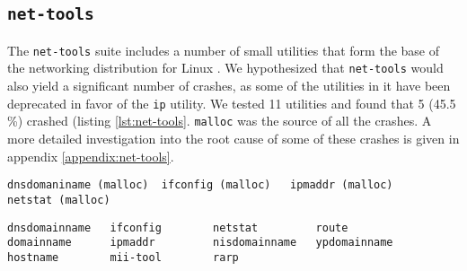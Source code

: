 \subsection{\texttt{net-tools}}
The \texttt{net-tools} suite includes a number of small utilities that form the base of the networking distribution for Linux \cite{nettools}. We hypothesized that \texttt{net-tools} would also yield a significant number of crashes, as some of the utilities in it have been deprecated in favor of the \texttt{ip} utility. We tested 11 utilities and found that 5 (45.5 \%) crashed (listing \ref{lst:net-tools}. \texttt{malloc} was the source of all  the crashes. A more detailed investigation into the root cause of some of these crashes is given in appendix \ref{appendix:net-tools}.

\begin{lstlisting}[label={lst:net-tools_crashes},caption={Crashes in net-tools}]
dnsdomaniname (malloc)	ifconfig (malloc)	ipmaddr (malloc)	netstat (malloc)
\end{lstlisting}

\begin{lstlisting}[label={lst:net-tools},caption={Crashes in net-tools}]
dnsdomainname   ifconfig        netstat         route
domainname      ipmaddr         nisdomainname   ypdomainname
hostname        mii-tool        rarp
\end{lstlisting}